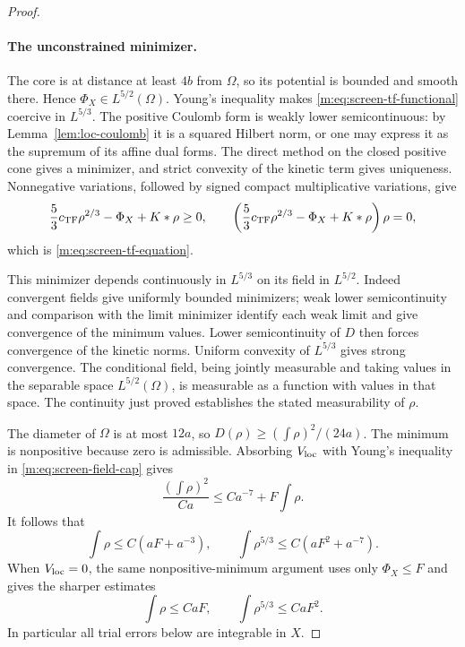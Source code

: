 \begin{proof}
\paragraph{The unconstrained minimizer.}
The core is at distance at least $4b$ from $\Omega$, so its potential
is bounded and smooth there.  Hence $\Phi_X\in L^{5/2}(\Omega)$.
Young's inequality makes \eqref{m:eq:screen-tf-functional} coercive in
$L^{5/3}$.  The positive Coulomb form is weakly lower semicontinuous:
by Lemma~\ref{lem:loc-coulomb} it is a squared Hilbert norm, or
one may express it as the supremum of its affine dual forms.
The direct method on the closed positive cone gives a minimizer,
and strict convexity of the kinetic term gives uniqueness.
Nonnegative variations, followed by signed compact multiplicative
variations, give
\[
 \frac53c_{\mathrm{TF}}\rho^{2/3}-\Phi_X+K*\rho\ge0,
 \qquad
 \left(\frac53c_{\mathrm{TF}}\rho^{2/3}-\Phi_X+K*\rho\right)\rho=0,
\]
which is \eqref{m:eq:screen-tf-equation}.

This minimizer depends continuously in $L^{5/3}$ on its field in
$L^{5/2}$.  Indeed convergent fields give uniformly bounded minimizers;
weak lower semicontinuity and comparison with the limit minimizer
identify each weak limit and give convergence of the minimum values.
Lower semicontinuity of $D$ then forces convergence of the kinetic
norms.  Uniform convexity of $L^{5/3}$ gives strong convergence.
The conditional field, being jointly measurable and taking values
in the separable space $L^{5/2}(\Omega)$, is measurable as a
function with values in that space.  The continuity just proved
establishes the stated measurability of $\rho$.

The diameter of $\Omega$ is at most $12a$, so
$D(\rho)\ge(\int\rho)^2/(24a)$.  The minimum is nonpositive because
zero is admissible.  Absorbing $V_{\rm loc}$ with Young's inequality
in \eqref{m:eq:screen-field-cap} gives
\[
 \frac{(\int\rho)^2}{Ca}\le Ca^{-7}+F\int\rho.
\]
It follows that
\begin{equation}\label{m:eq:screen-tf-mass}
 \int\rho\le C(aF+a^{-3}),\qquad
 \int\rho^{5/3}\le C(aF^2+a^{-7}).
\end{equation}
When $V_{\rm loc}=0$, the same nonpositive-minimum argument uses
only $\Phi_X\le F$ and gives the sharper estimates
\begin{equation}\label{a:eq:screen-minimizer-mass}
 \int\rho\le CaF,\qquad \int\rho^{5/3}\le CaF^2.
\end{equation}
In particular all trial errors below are integrable in $X$.


\end{proof}
